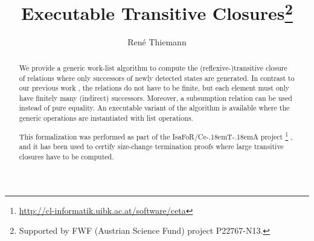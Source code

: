 \documentclass[11pt,a4paper]{article}
\newcommand\isafor{\textsf{IsaFoR}}
\newcommand\ceta{\textsf{Ce\kern-.18emT\kern-.18emA}}
\begin{document}
\title{Executable Transitive Closures\footnote{Supported by FWF (Austrian Science Fund) project P22767-N13.}}
\author{Ren\'e Thiemann}
\maketitle

\begin{abstract}
  We provide a generic work-list algorithm to compute the (reflexi\-\mbox{ve-)}transitive closure of
  relations where only successors of newly detected states are generated.
  In contrast to our previous work \cite{rtrancl_fin}, the relations do not have to be finite, 
  but each element must only have finitely many (indirect) successors. 
  Moreover, a subsumption relation can be used instead of pure equality.
  An executable variant of the algorithm is available where the generic operations are instantiated
  with list operations.
    
    This formalization was performed as part of the \isafor/\ceta{} project%
  \footnote{\url{http://cl-informatik.uibk.ac.at/software/ceta}} \cite{CeTA},
  and it has been used to certify size-change 
  termination proofs where large transitive closures have to be computed.
\end{abstract}

\tableofcontents








\end{document}
